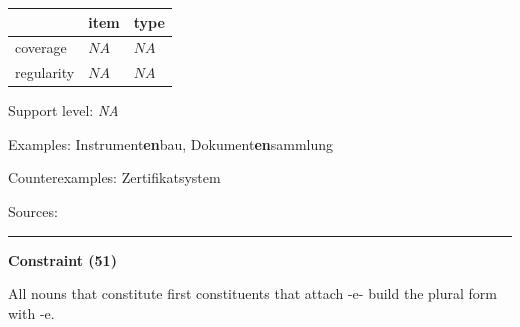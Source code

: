 \vspace{-0.25em}

\begin{table}[!ht]
\begin{center}
\setlength{\extrarowheight}{1pt}
\begin{tabularx}{\columnwidth}{|X|X|X|}
\hline
 & item & type \\
\hline
 coverage & $NA$ & $NA$ \\
\hline
 regularity & $NA$ & $NA$ \\
\hline
\end{tabularx}
\end{center}
\end{table}

\vspace{-1.35em}

\noindent
Support level: \textit{NA}

\vspace{0.3em}

\noindent
Examples: Instrument\textbf{en}bau, Dokument\textbf{en}sammlung

\noindent
Counterexamples: Zertifikat{\zeroLinker}system

\vspace{0.3em}

\noindent
Sources: \citet[78, 79]{ortner_mueller-bollhagen_1991}

\vspace{0.35em}
\hrule




\vspace{0.4em}

\begin{center}
\textbf{Constraint (51)}
\end{center}

\noindent
All nouns that constitute first constituents that attach -e- build the plural form with -e.
\vspace{0.5em}


